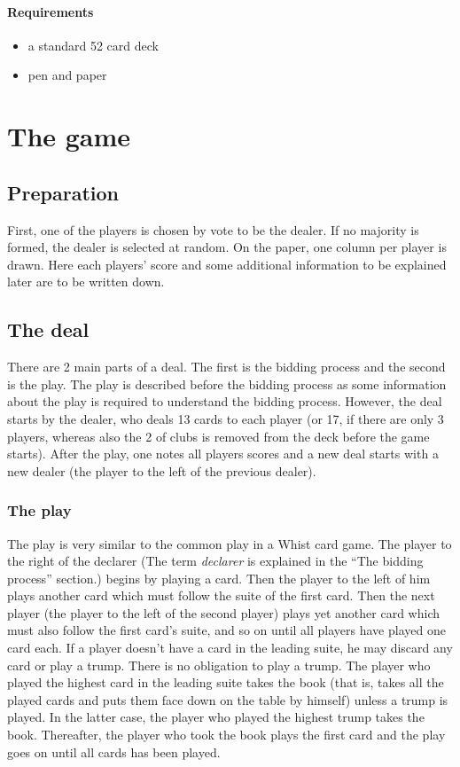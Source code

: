 \documentclass[a4paper, 11pt]{article}
\begin{document}
		\paragraph{Requirements}
		\begin{itemize}
			\item a standard 52 card deck
			\item pen and paper
		\end{itemize}
		
	\section{The game}
		\subsection{Preparation}
		First, one of the players is chosen by vote to be the dealer. If no majority is formed, the dealer is selected at random. On the paper, one column per player is drawn. Here each players' score and some additional information to be explained later are to be written down.

		\subsection{The deal}
		There are 2 main parts of a deal. The first is the bidding process and the second is the play. The play is described before the bidding process as some information about the play is required to understand the bidding process. However, the deal starts by the dealer, who deals 13 cards to each player (or 17, if there are only 3 players, whereas also the 2 of clubs is removed from the deck before the game starts). After the play, one notes all players scores and a new deal starts with a new dealer (the player to the left of the previous dealer).
			\subsubsection{The play}
			The play is very similar to the common play in a Whist card game. The player to the right of the declarer (The term \emph{declarer} is explained in the ``The bidding process'' section.) begins by playing a card. Then the player to the left of him plays another card which must follow the suite of the first card. Then the next player (the player to the left of the second player) plays yet another card which must also follow the first card's suite, and so on until all players have played one card each. If a player doesn't have a card in the leading suite, he may discard any card or play a trump. There is no obligation to play a trump. The player who played the highest card in the leading suite takes the book (that is, takes all the played cards and puts them face down on the table by himself) unless a trump is played. In the latter case, the player who played the highest trump takes the book. Thereafter, the player who took the book plays the first card and the play goes on until all cards has been played.
			
\end{document}
